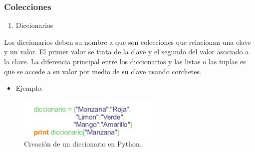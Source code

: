 \begin{frame}[fragile]
  \frametitle{Colecciones}

  \begin{enumerate}[3.]
    \item Diccionarios    
  \end{enumerate}

  Los diccionarios deben su nombre a que son colecciones que relacionan una clave y un valor. El primer valor se trata de la clave y el segundo del valor asociado a la clave. La diferencia principal entre los diccionarios y las listas o las tuplas es que se accede a su valor por medio de su clave usando corchetes.

  \begin{itemize}
    \item Ejemplo:
  \end{itemize}

  \begin{figure}
    \includegraphics[width=0.6\textwidth]{Imagenes/Diccionarios.jpg}
    \caption{\label{fig:Ejemplo3}Creaci\'on de un diccionario en Python.}
  \end{figure}  
 
 
\end{frame}
